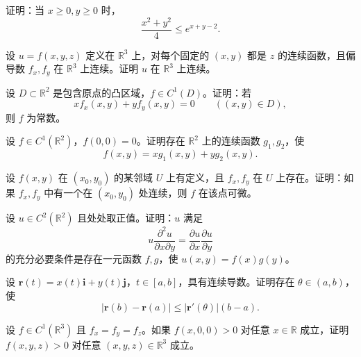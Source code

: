 \noindent\begin{minipage}{\textwidth}
证明：当 $x\ge0, y\ge0$ 时，\[\frac{x^2+y^2}{4}\le e^{x+y-2}.\]
\end{minipage}\par\vfill
\newpage
\noindent\begin{minipage}{\textwidth}
设 $u=f(x,y,z)$ 定义在 $\mathbb R^3$ 上，对每个固定的 $(x,y)$ 都是 $z$ 的连续函数，且偏导数 $f_x,f_y$ 在 $\mathbb R^3$ 上连续。证明 $u$ 在 $\mathbb R^3$ 上连续。
\end{minipage}\par\vfill
\noindent\begin{minipage}{\textwidth}
设 $D\subset\mathbb R^2$ 是包含原点的凸区域，$f\in C^1(D)$。证明：若\[x f_x(x,y)+y f_y(x,y)=0\qquad((x,y)\in D),\]则 $f$ 为常数。
\end{minipage}\par\vfill
\noindent\begin{minipage}{\textwidth}
设 $f\in C^1(\mathbb R^2)$，$f(0,0)=0$。证明存在 $\mathbb R^2$ 上的连续函数 $g_1,g_2$，使\[f(x,y)=xg_1(x,y)+yg_2(x,y).\]
\end{minipage}\par\vfill
\noindent\begin{minipage}{\textwidth}
设 $f(x,y)$ 在 $(x_0,y_0)$ 的某邻域 $U$ 上有定义，且 $f_x,f_y$ 在 $U$ 上存在。证明：如果 $f_x,f_y$ 中有一个在 $(x_0,y_0)$ 处连续，则 $f$ 在该点可微。
\end{minipage}\par\vfill
\newpage
\noindent\begin{minipage}{\textwidth}
设 $u\in C^2(\mathbb R^2)$ 且处处取正值。证明：$u$ 满足\[u\frac{\partial^2u}{\partial x\partial y}=\frac{\partial u}{\partial x}\frac{\partial u}{\partial y}\]的充分必要条件是存在一元函数 $f,g$，使 $u(x,y)=f(x)g(y)$。
\end{minipage}\par\vfill
\noindent\begin{minipage}{\textwidth}
设 $\boldsymbol r(t)=x(t)\boldsymbol i+y(t)\boldsymbol j$，$t\in[a,b]$，具有连续导数。证明存在 $\theta\in(a,b)$，使\[|\boldsymbol r(b)-\boldsymbol r(a)|\le |\boldsymbol r'(\theta)|(b-a).\]
\end{minipage}\par\vfill
\noindent\begin{minipage}{\textwidth}
设 $f\in C^1(\mathbb R^3)$ 且 $f_x=f_y=f_z$。如果 $f(x,0,0)>0$ 对任意 $x\in\mathbb R$ 成立，证明 $f(x,y,z)>0$ 对任意 $(x,y,z)\in\mathbb R^3$ 成立。
\end{minipage}\par\vfill
